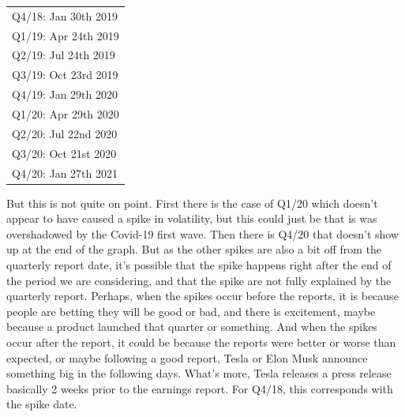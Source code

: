 \begin{tabular}{l}
Q4/18: Jan 30th 2019 \\
Q1/19: Apr 24th 2019 \\
Q2/19: Jul 24th 2019 \\%
Q3/19: Oct 23rd 2019 \\
Q4/19: Jan 29th 2020 \\
Q1/20: Apr 29th 2020 \\
Q2/20: Jul 22nd 2020 \\
Q3/20: Oct 21st 2020 \\
Q4/20: Jan 27th 2021
\end{tabular}


But this is not quite on point. First there is the case of Q1/20 which doesn't appear to have caused a spike in volatility, but this could just be that is was overshadowed by the Covid-19 first wave. Then there is Q4/20 that doesn't show up at the end of the graph. But as the other spikes are also a bit off from the quarterly report date, it's possible that the spike happens right after the end of the period we are considering, and that the spike are not fully explained by the quarterly report. Perhaps, when the spikes occur before the reports, it is because people are betting they will be good or bad, and there is excitement, maybe because a product launched that quarter or something. And when the spikes occur after the report, it could be because the reports were better or worse than expected, or maybe following a good report, Tesla or Elon Musk announce something big in the following days.
What's more, Tesla releases a press release basically 2 weeks prior to the earnings report. For Q4/18, this corresponds with the spike date.

